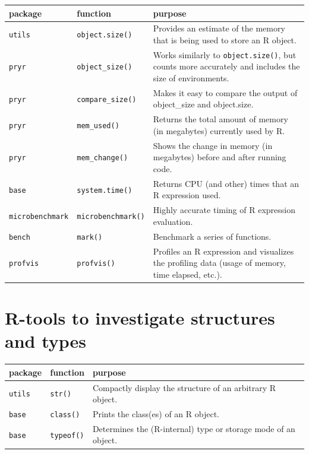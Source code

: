\documentclass[
  12pt,
]{style/krantz}
\begin{document}
\begin{longtable}[]{@{}
  >{\raggedright\arraybackslash}p{}
  >{\raggedright\arraybackslash}p{}
  >{\raggedright\arraybackslash}p{}@{}}
\toprule
package & function & purpose \\
\midrule
\endhead
\texttt{utils} & \texttt{object.size()} & Provides an estimate of the memory that is being used to store an R object. \\
\texttt{pryr} & \texttt{object\_size()} & Works similarly to \texttt{object.size()}, but counts more accurately and includes the size of environments. \\
\texttt{pryr} & \texttt{compare\_size()} & Makes it easy to compare the output of object\_size and object.size. \\
\texttt{pryr} & \texttt{mem\_used()} & Returns the total amount of memory (in megabytes) currently used by R. \\
\texttt{pryr} & \texttt{mem\_change()} & Shows the change in memory (in megabytes) before and after running code. \\
\texttt{base} & \texttt{system.time()} & Returns CPU (and other) times that an R expression used. \\
\texttt{microbenchmark} & \texttt{microbenchmark()} & Highly accurate timing of R expression evaluation. \\
\texttt{bench} & \texttt{mark()} & Benchmark a series of functions. \\
\texttt{profvis} & \texttt{profvis()} & Profiles an R expression and visualizes the profiling data (usage of memory, time elapsed, etc.). \\
\bottomrule
\end{longtable}

\hypertarget{r-tools-to-investigate-structures-and-types}{%
\section{R-tools to investigate structures and types}\label{r-tools-to-investigate-structures-and-types}}

\begin{longtable}[]{@{}
  >{\raggedright\arraybackslash}p{}
  >{\raggedright\arraybackslash}p{}
  >{\raggedright\arraybackslash}p{}@{}}
\toprule
package & function & purpose \\
\midrule
\endhead
\texttt{utils} & \texttt{str()} & Compactly display the structure of an arbitrary R object. \\
\texttt{base} & \texttt{class()} & Prints the class(es) of an R object. \\
\texttt{base} & \texttt{typeof()} & Determines the (R-internal) type or storage mode of an object. \\
\bottomrule
\end{longtable}
\end{document}
